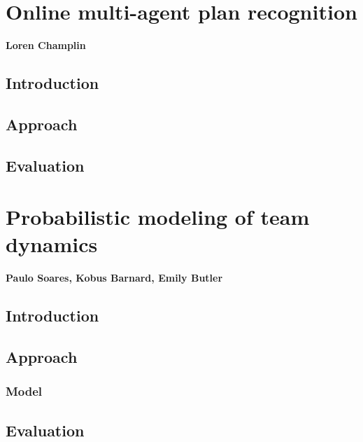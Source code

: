 \documentclass[oneside,9pt]{memoir}
\begin{document}
\chapter{Online multi-agent plan recognition}
\textbf{Loren Champlin}
\section{Introduction}
\section{Approach}
\section{Evaluation}

\chapter{Probabilistic modeling of team dynamics}
\textbf{Paulo Soares, Kobus Barnard, Emily Butler}
\section{Introduction}
\section{Approach}
\subsection{Model}
\section{Evaluation}

\printbibliography
\end{document}
